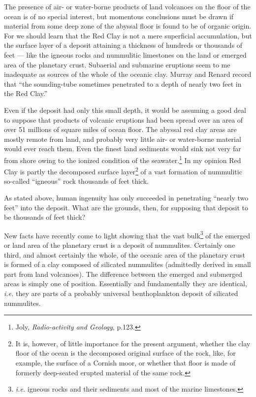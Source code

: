 \documentclass[a4paper, 12pt, oneside, landscape]{article}
\begin{document}
The presence of air- or water-borne products of land volcanoes on the floor of the ocean is of no special interest, but momentous conclusions must be drawn if material from some deep zone of the abyssal floor is found to be of organic origin. For we should learn that the Red Clay is not a mere superficial accumulation, but the surface layer of a deposit attaining a thickness of hundreds or thousands of feet --- like the igneous rocks and nummulitic limestones on the land or emerged area of the planetary crust. Subaerial and submarine eruptions seem to me inadequate as sources of the whole of the oceanic clay. Murray and Renard record that ``the sounding-tube sometimes penetrated to a depth of nearly two feet in the Red Clay.''

Even if the deposit had only this small depth, it would be assuming a good deal to suppose that products of volcanic eruptions had been spread over an area of over 51 millions of square miles of ocean floor. The abyssal red clay areas are mostly remote from land, and probably very little air- or water-borne material would ever reach them. Even the finest land sediments would sink not very far from shore owing to the ionized condition of the seawater.\footnote{Joly, \emph{Radio-activity and Geology}, p.123.} In my opinion Red Clay is partly the decomposed surface layer\footnote{It is, however, of little importance for the present argument, whether the clay floor of the ocean is the decomposed original surface of the rock, like, for example, the surface of a Cornish moor, or whether that floor is made of formerly deep-seated erupted material of the same rock.} of a vast formation of nummulitic so-called ``igneous'' rock thousands of feet thick.

As stated above, human ingenuity has only succeeded in penetrating ``nearly two feet'' into the deposit. What are the grounds, then, for supposing that deposit to be thousands of feet thick?

New facts have recently come to light showing that the vast bulk\footnote{\emph{i.e.} igneous rocks and their sediments and most of the marine limestones.} of the emerged or land area of the planetary crust is a deposit of nummulites. Certainly one third, and almost certainly the whole, of the oceanic area of the planetary crust is formed of a clay composed of silicated nummulites (admittedly derived in small part from land volcanoes). The difference between the emerged and submerged areas is simply one of position. Essentially and fundamentally they are identical, \emph{i.e.} they are parts of a probably universal benthoplankton deposit of silicated nummulites.
\end{document}
